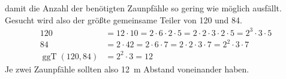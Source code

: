 \begin{exercise}
    damit die Anzahl der benötigten Zaunpfähle
    so gering wie möglich ausfällt.
    Gesucht wird also der größte gemeinsame
    Teiler von \num{120} und \num{84}.
    \begin{equation*}
      \begin{split}
        120&=12\cdot10=2\cdot6\cdot2\cdot5=2\cdot2\cdot3\cdot2\cdot5=2^3\cdot3\cdot5
        \\
        84&=2\cdot42=2\cdot6\cdot7=2\cdot2\cdot3\cdot7=2^2\cdot3\cdot7
        \\
        \operatorname{ggT}(120,84)&=2^2\cdot3=12
      \end{split}
    \end{equation*}
    Je zwei Zaunpfähle sollten also \SI{12}{\metre}
    Abstand voneinander haben.
    \begin{center}
\end{center}
\end{exercise}
